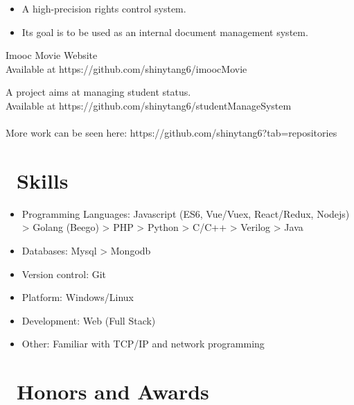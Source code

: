 \documentclass{resume}
\begin{document}
\begin{itemize}
  \item A high-precision rights control system. 
  \item Its goal is to be used as an internal document management system.
\end{itemize}


Imooc Movie Website\\
Available at https://github.com/shinytang6/imoocMovie


A project aims at managing student status.\\
Available at https://github.com/shinytang6/studentManageSystem
\\
\\
More work can be seen here: https://github.com/shinytang6?tab=repositories


\section{\faCogs\ Skills}
\begin{itemize}[parsep=0.5ex]
  \item Programming Languages: Javascript (ES6, Vue/Vuex, React/Redux, Nodejs) > Golang (Beego) > PHP > Python > C/C++ > Verilog > Java
  \item Databases: Mysql > Mongodb
  \item Version control: Git
  \item Platform: Windows/Linux
  \item Development: Web (Full Stack)
  \item Other: Familiar with TCP/IP and network programming
\end{itemize}

\section{\faHeartO\ Honors and Awards}
\end{document}
